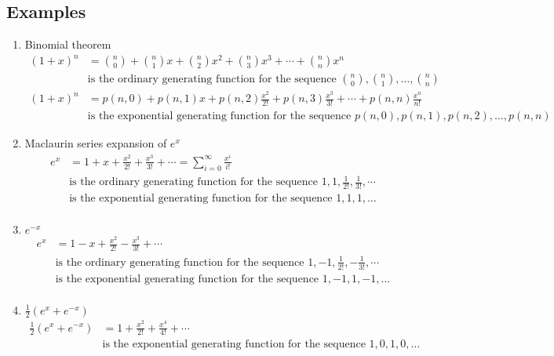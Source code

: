 \documentclass[a4paper]{article}
\begin{document}
\subsection*{Examples}
\begin{enumerate}
    \item Binomial theorem
    \begin{align*}
    (1+x)^n&=\binom{n}{0}+\binom{n}{1}x+\binom{n}{2}x^2+\binom{n}{3}x^3+\cdots+\binom{n}{n}x^n\\
    &\text{is the ordinary generating function for the sequence }\binom{n}{0},\binom{n}{1},\dots,\binom{n}{n}\\
    (1+x)^n&=p(n,0)+p(n,1)x+p(n,2)\frac{x^2}{2!}+p(n,3)\frac{x^3}{3!}+\cdots+p(n,n)\frac{x^n}{n!}\\
    &\text{is the exponential generating function for the sequence }p(n,0),p(n,1),p(n,2),\dots, p(n,n)
    \end{align*}

\item Maclaurin series expansion of $e^x$
\begin{align*}
e^x&=1+x+\frac{x^2}{2!}+\frac{x^3}{3!}+\cdots=\sum_{i=0}^{\infty}{\frac{x^i}{i!}}\\
&\text{is the ordinary generating function for the sequence }1,1,\frac{1}{2!},\frac{1}{3!},\cdots\\
&\text{is the exponential generating function for the sequence }1,1,1,\dots\\
\end{align*}

\item $e^{-x}$
\begin{align*}
e^x&=1-x+\frac{x^2}{2!}-\frac{x^3}{3!}+\cdots\\
&\text{is the ordinary generating function for the sequence }1,-1,\frac{1}{2!},-\frac{1}{3!},\cdots\\
&\text{is the exponential generating function for the sequence }1,-1,1,-1,\dots\\
\end{align*}

\item $\frac{1}{2}(e^x+e^{-x})$
\begin{align*}
\frac{1}{2}(e^x+e^{-x})&=1+\frac{x^2}{2!}+\frac{x^4}{4!}+\cdots\\
&\text{is the exponential generating function for the sequence }1,0,1,0,\dots\\
\end{align*}


\end{enumerate}
\end{document}
